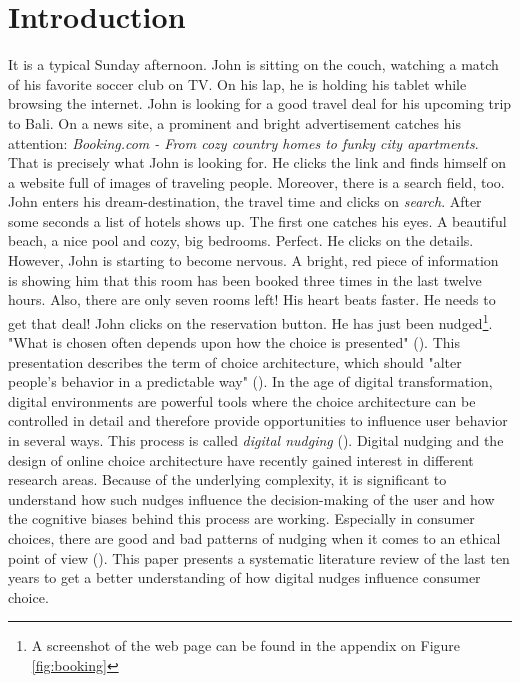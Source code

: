 \section{Introduction}
It is a typical Sunday afternoon. John is sitting on the couch, watching a match of his favorite soccer club on TV. On his lap, he is holding his tablet while browsing the internet. John is looking for a good travel deal for his upcoming trip to Bali. On a news site, a prominent and bright advertisement catches his attention: \textit{Booking.com - From cozy country homes to funky city apartments}. That is precisely what John is looking for. He clicks the link and finds himself on a website full of images of traveling people. Moreover, there is a search field, too. John enters his dream-destination, the travel time and clicks on \textit{search}. After some seconds a list of hotels shows up. The first one catches his eyes. A beautiful beach, a nice pool and cozy, big bedrooms. Perfect. He clicks on the details. However,  John is starting to become nervous. A bright, red piece of information is showing him that this room has been booked three times in the last twelve hours. Also, there are only seven rooms left! His heart beats faster. He needs to get that deal! John clicks on the reservation button. He has just been nudged\footnote{A screenshot of the web page can be found in the appendix on Figure \ref{fig:booking}}.
\\

"What is chosen often depends upon how the choice is presented" (\cite[p.488]{johnson_beyond_2012}). This presentation describes the term of choice architecture, which should "alter people's behavior in a predictable way" (\cite[p.6]{thaler_nudge:_2009}). In the age of digital transformation, digital environments are powerful tools where the choice architecture can be controlled in detail and therefore provide opportunities to influence user behavior in several ways. This process is called \textit{digital nudging} (\cite{weinmann_digital_2016}).
Digital nudging and the design of online choice architecture have recently gained interest in different research areas. Because of the underlying complexity, it is significant to understand how such nudges influence the decision-making of the user and how the cognitive biases behind this process are working. Especially in consumer choices, there are good and bad patterns of nudging when it comes to an ethical point of view (\cite{sunstein_nudging_2015}). This paper presents a systematic literature review of the last ten years to get a better understanding of how digital nudges influence consumer choice. 
\\

